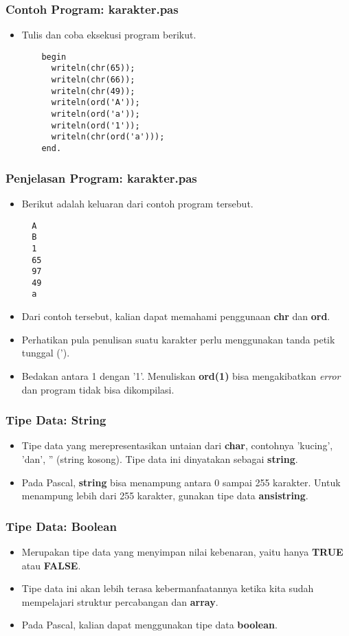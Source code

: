 \begin{frame}[fragile]
\frametitle{Contoh Program: karakter.pas}
\begin{itemize}
  \item Tulis dan coba eksekusi program berikut.
  \begin{lstlisting}
    begin
      writeln(chr(65));
      writeln(chr(66));
      writeln(chr(49));
      writeln(ord('A'));
      writeln(ord('a'));
      writeln(ord('1'));
      writeln(chr(ord('a')));
    end.
  \end{lstlisting}
\end{itemize}
\end{frame}

\begin{frame}[fragile]
\frametitle{Penjelasan Program: karakter.pas}
\begin{itemize}
  \item Berikut adalah keluaran dari contoh program tersebut.
  \begin{lstlisting}
  A
  B
  1
  65
  97
  49
  a
  \end{lstlisting}
  \item Dari contoh tersebut, kalian dapat memahami penggunaan \textbf{chr} dan \textbf{ord}.
  \item Perhatikan pula penulisan suatu karakter perlu menggunakan tanda petik tunggal (').
  \item Bedakan antara 1 dengan '1'. Menuliskan \textbf{ord(1)} bisa mengakibatkan \textit{error} dan program tidak bisa dikompilasi.
\end{itemize}
\end{frame}

\begin{frame}
\frametitle{Tipe Data: String}
\begin{itemize}
  \item Tipe data yang merepresentasikan untaian dari \textbf{char}, contohnya 'kucing', 'dan', '' (string kosong). Tipe data ini dinyatakan sebagai \alert{\textbf{string}}.
  \item Pada Pascal, \textbf{string} bisa menampung antara 0 sampai 255 karakter. Untuk menampung lebih dari 255 karakter, gunakan tipe data \alert{\textbf{ansistring}}.
\end{itemize}
\end{frame}

\begin{frame}
\frametitle{Tipe Data: Boolean}
\begin{itemize}
  \item Merupakan tipe data yang menyimpan nilai kebenaran, yaitu hanya \textbf{TRUE} atau \textbf{FALSE}.
  \item Tipe data ini akan lebih terasa kebermanfaatannya ketika kita sudah mempelajari struktur percabangan dan \textbf{array}.
  \item Pada Pascal, kalian dapat menggunakan tipe data \alert{\textbf{boolean}}.
\end{itemize}
\end{frame}

